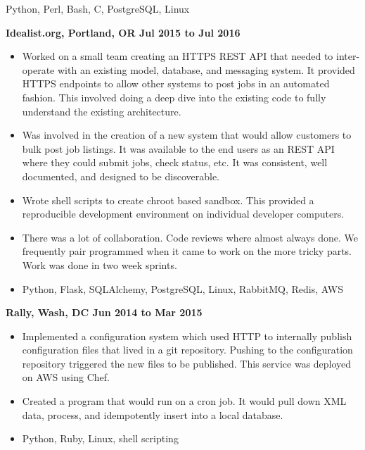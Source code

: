 \documentclass{res}
\begin{document}
\begin{resume}
\begin{itemize}
    Python, Perl, Bash, C, PostgreSQL, Linux

  \end{itemize}

  {\large \bf Idealist.org, Portland, OR \hfill Jul 2015 to Jul 2016}

  \begin{itemize} \item
    Worked on a small team creating an HTTPS REST API that needed
    to inter-operate with an existing model, database, and messaging
    system. It provided HTTPS endpoints to allow other systems to post
    jobs in an automated fashion.  This involved doing
    a deep dive into the existing code to fully understand the existing
    architecture.

    \item

    Was involved in the creation of a new system that would allow
    customers to bulk post job listings.  It was available to the end users
    as an REST API where they could submit jobs, check status, etc.
    It was consistent, well documented, and designed to be discoverable.

  \item

    Wrote shell scripts to create chroot based sandbox.  This provided
    a reproducible development environment on individual developer
    computers.

    \item

    There was a lot of collaboration.  Code reviews where almost always
    done.  We frequently pair programmed when it came to work on the
    more tricky parts.  Work was done in two week sprints.

  \item

    Python, Flask, SQLAlchemy, PostgreSQL, Linux, RabbitMQ, Redis, AWS

  \end{itemize}

  {\large \bf Rally, Wash, DC \hfill Jun 2014 to Mar 2015}

  \begin{itemize}

  \item
    Implemented a configuration system which used HTTP to
    internally publish configuration files that lived in a git repository.
    Pushing to the configuration repository triggered the new files
    to be published.  This service was deployed on AWS using Chef.
  \item
    Created a program that would run on a cron job.  It would pull down
    XML data, process, and idempotently insert into a local database.
  \item
    Python, Ruby, Linux, shell scripting


\end{itemize}
\end{resume}
\end{document}
